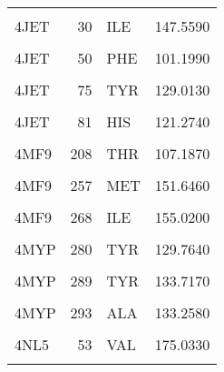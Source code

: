 \begin{table}
\begin{tabular}{lrlr}
			\cellcolor{gray!6}{4JET} & \cellcolor{gray!6}{147} & \cellcolor{gray!6}{MET} & \cellcolor{gray!6}{164.8890}\\
			\addlinespace
			4JET & 30 & ILE & 147.5590\\
			\cellcolor{gray!6}{4JET} & \cellcolor{gray!6}{40} & \cellcolor{gray!6}{ARG} & \cellcolor{gray!6}{117.6700}\\
			4JET & 50 & PHE & 101.1990\\
			\cellcolor{gray!6}{4JET} & \cellcolor{gray!6}{55} & \cellcolor{gray!6}{TYR} & \cellcolor{gray!6}{128.1770}\\
			4JET & 75 & TYR & 129.0130\\
			\addlinespace
			\cellcolor{gray!6}{4JET} & \cellcolor{gray!6}{77} & \cellcolor{gray!6}{PHE} & \cellcolor{gray!6}{57.4300}\\
			4JET & 81 & HIS & 121.2740\\
			\cellcolor{gray!6}{4MF9} & \cellcolor{gray!6}{112} & \cellcolor{gray!6}{ARG} & \cellcolor{gray!6}{134.9890}\\
			4MF9 & 208 & THR & 107.1870\\
			\cellcolor{gray!6}{4MF9} & \cellcolor{gray!6}{209} & \cellcolor{gray!6}{HIS} & \cellcolor{gray!6}{108.6490}\\
			\addlinespace
			4MF9 & 257 & MET & 151.6460\\
			\cellcolor{gray!6}{4MF9} & \cellcolor{gray!6}{259} & \cellcolor{gray!6}{PHE} & \cellcolor{gray!6}{124.8600}\\
			4MF9 & 268 & ILE & 155.0200\\
			\cellcolor{gray!6}{4MYP} & \cellcolor{gray!6}{205} & \cellcolor{gray!6}{SER} & \cellcolor{gray!6}{154.8290}\\
			4MYP & 280 & TYR & 129.7640\\
			\addlinespace
			\cellcolor{gray!6}{4MYP} & \cellcolor{gray!6}{282} & \cellcolor{gray!6}{ALA} & \cellcolor{gray!6}{153.2720}\\
			4MYP & 289 & TYR & 133.7170\\
			\cellcolor{gray!6}{4MYP} & \cellcolor{gray!6}{292} & \cellcolor{gray!6}{GLN} & \cellcolor{gray!6}{16.1591}\\
			4MYP & 293 & ALA & 133.2580\\
			\cellcolor{gray!6}{4NL5} & \cellcolor{gray!6}{23} & \cellcolor{gray!6}{PHE} & \cellcolor{gray!6}{91.4353}\\
			\addlinespace
			4NL5 & 53 & VAL & 175.0330\\
			\cellcolor{gray!6}{4NL5} & \cellcolor{gray!6}{66} & \cellcolor{gray!6}{TRP} & \cellcolor{gray!6}{112.7010}\\

\end{tabular}
\end{table}
